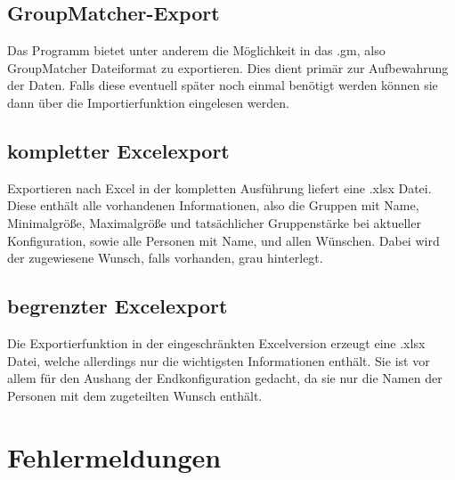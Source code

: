 \documentclass[a4paper,11pt]{article}
\begin{document}
\subsection{GroupMatcher-Export}
\label{ssec:exportgm}

Das Programm bietet unter anderem die Möglichkeit in das .gm, also GroupMatcher Dateiformat zu exportieren. Dies dient primär zur Aufbewahrung der Daten. Falls diese eventuell später noch einmal benötigt werden können sie dann über die Importierfunktion eingelesen werden.

\subsection{kompletter Excelexport}
\label{ssec:exportexf}

Exportieren nach Excel in der kompletten Ausführung liefert eine .xlsx Datei. Diese enthält alle vorhandenen Informationen, also die Gruppen mit Name, Minimalgröße, Maximalgröße und tatsächlicher Gruppenstärke bei aktueller Konfiguration, sowie alle Personen mit Name, und allen Wünschen. Dabei wird der zugewiesene Wunsch, falls vorhanden, grau hinterlegt.

\subsection{begrenzter Excelexport}
\label{ssec:exportexl}

Die Exportierfunktion in der eingeschränkten Excelversion erzeugt eine .xlsx Datei, welche allerdings nur die wichtigsten Informationen enthält. Sie ist vor allem für den Aushang der Endkonfiguration gedacht, da sie nur die Namen der Personen mit dem zugeteilten Wunsch enthält.


\section{Fehlermeldungen}
\label{sec:errors}
\end{document}
